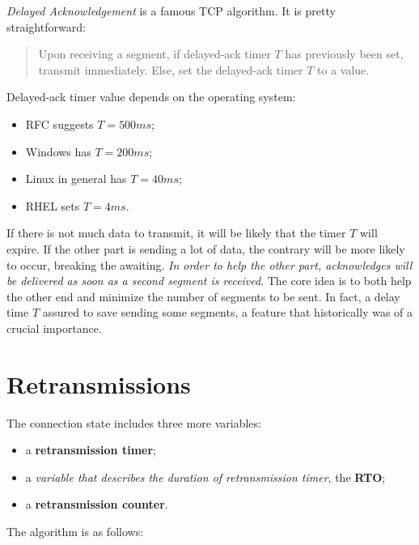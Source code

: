 \documentclass[a4paper, 11pt]{report}
\begin{document}
\emph{Delayed Acknowledgement} is a famous TCP algorithm. It is pretty
straightforward:

\begin{quote}
Upon receiving a segment, if delayed-ack timer $T$ has previously been set,
transmit immediately. Else, set the delayed-ack timer $T$ to a value.
\end{quote}

Delayed-ack timer value depends on the operating system:

\begin{itemize}
	\item RFC suggests $T = 500ms$;
	\item Windows has $T = 200ms$;
	\item Linux in general has $T = 40ms$;
	\item RHEL sets $T = 4ms$.
\end{itemize}

If there is not much data to transmit, it will be likely that the timer $T$
will expire. If the other part is sending a lot of data, the contrary will be
more likely to occur, breaking the awaiting. \emph{In order to help the other
part, acknowledges will be delivered as soon as a second segment is received}.
The core idea is to both help the other end and minimize the number of segments
to be sent. In fact, a delay time $T$ assured to save sending some segments, a
feature that historically was of a crucial importance.

\section{Retransmissions}

The connection state includes three more variables:

\begin{itemize}
	\item a \textbf{retransmission timer};
	\item a \emph{variable that describes the duration of retransmission
		timer}, the \textbf{RTO};
	\item a \textbf{retransmission counter}.
\end{itemize}

The algorithm is as follows:
\end{document}

